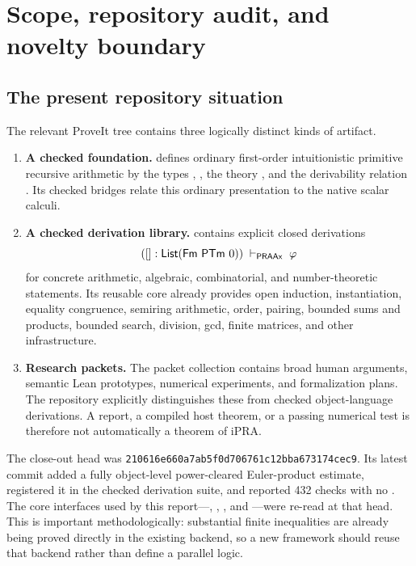 \section{Scope, repository audit, and novelty boundary}

\subsection{The present repository situation}

The relevant ProveIt tree contains three logically distinct kinds of artifact.

\begin{enumerate}
\item \textbf{A checked foundation.}   defines ordinary first-order intuitionistic primitive recursive arithmetic by the types , , the theory , and the derivability relation .  Its checked bridges relate this ordinary presentation to the native scalar calculi.
\item \textbf{A checked derivation library.}   contains explicit closed derivations
\[
   ([] : \mathsf{List}(\Fm\ \PTm\ 0))\;\vdash_{\PRAAx}\;\varphi
\]
for concrete arithmetic, algebraic, combinatorial, and number-theoretic statements.  Its reusable core already provides open induction, instantiation, equality congruence, semiring arithmetic, order, pairing, bounded sums and products, bounded search, division, gcd, finite matrices, and other infrastructure.
\item \textbf{Research packets.}  The packet collection contains broad human arguments, semantic Lean prototypes, numerical experiments, and formalization plans.  The repository explicitly distinguishes these from checked object-language derivations.  A report, a compiled host theorem, or a passing numerical test is therefore not automatically a theorem of iPRA.
\end{enumerate}

The close-out head was \texttt{210616e660a7ab5f0d706761c12bba673174cec9}.  Its latest commit added a fully object-level power-cleared Euler-product estimate, registered it in the checked derivation suite, and reported 432 checks with no .  The core interfaces used by this report---, , , and ---were re-read at that head.  This is important methodologically: substantial finite inequalities are already being proved directly in the existing  backend, so a new framework should reuse that backend rather than define a parallel logic.


